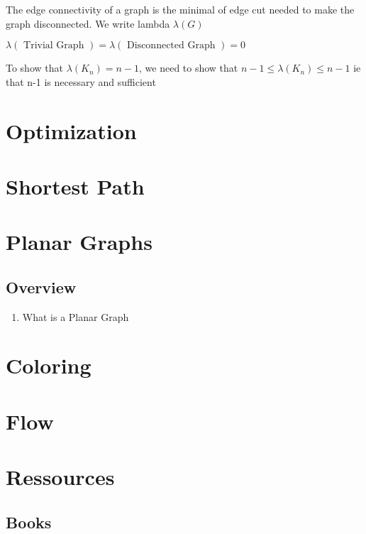 \documentclass{article}
\begin{document}
\begin{definition}
    The edge connectivity of a graph is the minimal of edge cut needed to make
    the graph disconnected. We write lambda $\lambda(G)$
\end{definition}

\begin{remark}
    $\lambda(\text{ Trivial Graph }) = \lambda(\text{ Disconnected Graph }) = 0$
\end{remark}

\begin{theorem}[Edge Connectivity of a complete graph is $\lambda(K_n)=n-1$]
    To show that $\lambda(K_n)=n-1$, we need to show that $ n-1 \leq
    \lambda(K_n) \leq n-1$ ie that n-1 is necessary and sufficient
\end{theorem}

\section{Optimization}
\section{Shortest Path}
\section{Planar Graphs}

\subsection{Overview}%
\label{sub:Overview}

\begin{enumerate}
    \item What is a Planar Graph
\end{enumerate}

\section{Coloring}
\section{Flow}

\section{Ressources}%
\label{sec:Ressources}

\subsection{Books}%
\label{sub:Books}
\end{document}
